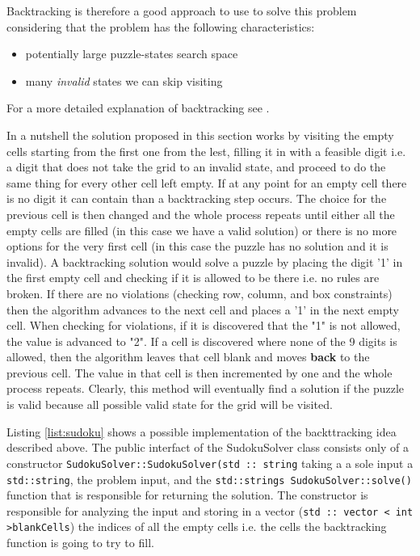 Backtracking is therefore a good approach to use to solve this problem considering that the problem
has the following characteristics:
\begin{itemize}
	\item potentially large puzzle-states search space
	\item many \textit{invalid} states we can skip visiting
\end{itemize}
For a more detailed explanation of backtracking see \cite{backtracking}.

In a nutshell the solution proposed in this section works by visiting the empty
cells starting from the first one from the lest, filling it in with a feasible
digit i.e. a digit that does not take the grid to an invalid state, and proceed
to do the same thing for every other cell left empty. If at any point for an
empty cell there is no digit it can contain than a backtracking step occurs. The
choice for the previous cell is then changed and the whole process repeats until
either all the empty cells are filled (in this case we have a valid solution) or
there is no more options for the very first cell (in this case the puzzle has no
solution and it is invalid).
A backtracking solution would solve a puzzle by placing the digit '1' in the
first empty cell and checking if it is allowed to be there i.e. no rules are broken. If
there are no violations (checking row, column, and box constraints) then the algorithm advances to
the next cell and places a '1' in the next empty cell. When checking for violations, if it is discovered that
the "1" is not allowed, the value is advanced to "2". If a cell is discovered where none of the 9
digits is allowed, then the algorithm leaves that cell blank and moves \textbf{back} to the previous cell.
The value in that cell is then incremented by one and the whole process repeats.
Clearly, this method will eventually find a solution if the puzzle is valid
because all possible valid state for the grid will be visited. 


Listing \ref{list:sudoku} shows a possible implementation of the backttracking
idea described above. The public interfact of the SudokuSolver class consists
only of a constructor \lstinline[columns=fixed]{SudokuSolver::SudokuSolver(std :: string} taking a
a sole input a \lstinline[columns=fixed]{std::string}, the problem input, and
the \lstinline[columns=fixed]{std::strings SudokuSolver::solve()} function
that is responsible for returning the solution. The constructor is responsible
for analyzing the input and storing in a vector (\lstinline[columns=fixed]{std :: vector < int >blankCells}) the indices of all the empty
cells i.e. the cells the backtracking function is going to try to fill.

